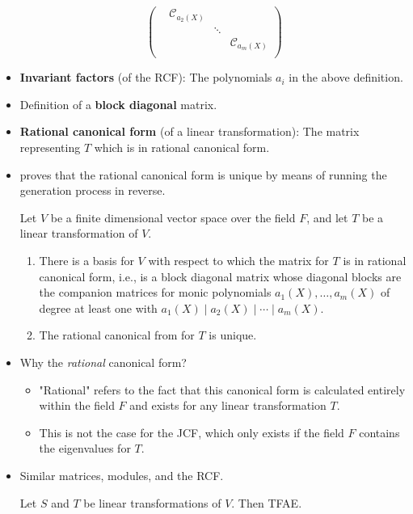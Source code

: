 \documentclass[../notes.tex]{subfiles}
\begin{document}
\begin{itemize}
\begin{equation*}
\begin{pmatrix}
             & \mathcal{C}_{a_2(X)} &  & \\
             &  & \ddots & \\
             &  &  & \mathcal{C}_{a_m(X)}\\
        \end{pmatrix}
    \end{equation*}
    \item \textbf{Invariant factors} (of the RCF): The polynomials $a_i$ in the above definition.
    \item Definition of a \textbf{block diagonal} matrix.
    \item \textbf{Rational canonical form} (of a linear transformation): The matrix representing $T$ which is in rational canonical form.
    \item \textcite{bib:DummitFoote} proves that the rational canonical form is unique by means of running the generation process in reverse.
    \begin{theorem}\label{trm:12.14}
        Let $V$ be a finite dimensional vector space over the field $F$, and let $T$ be a linear transformation of $V$.
        \begin{enumerate}
            \item There is a basis for $V$ with respect to which the matrix for $T$ is in rational canonical form, i.e., is a block diagonal matrix whose diagonal blocks are the companion matrices for monic polynomials $a_1(X),\dots,a_m(X)$ of degree at least one with $a_1(X)\mid a_2(X)\mid\cdots\mid a_m(X)$.
            \item The rational canonical from for $T$ is unique.
        \end{enumerate}
    \end{theorem}
    \item Why the \emph{rational} canonical form?
    \begin{itemize}
        \item "Rational" refers to the fact that this canonical form is calculated entirely within the field $F$ and exists for any linear transformation $T$.
        \item This is not the case for the JCF, which only exists if the field $F$ contains the eigenvalues for $T$.
    \end{itemize}
    \item Similar matrices, modules, and the RCF.
    \begin{theorem}\label{trm:12.15}
        Let $S$ and $T$ be linear transformations of $V$. Then TFAE.

\end{theorem}
\end{itemize}
\end{document}
